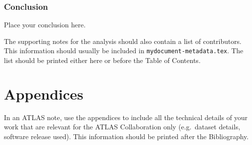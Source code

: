 \documentclass[NOTE, atlasdraft=true, texlive=2016, UKenglish]{\ATLASLATEXPATH atlasdoc}
\begin{document}


\section{Conclusion}
\label{sec:conclusion}

Place your conclusion here.


\printbibliography
%
%

\clearpage
The supporting notes for the analysis should also contain a list of contributors.
This information should usually be included in \texttt{mydocument-metadata.tex}.
The list should be printed either here or before the Table of Contents.


\clearpage
\appendix
\part*{Appendices}

In an ATLAS note, use the appendices to include all the technical details of your work
that are relevant for the ATLAS Collaboration only (e.g.\ dataset details, software release used).
This information should be printed after the Bibliography.
\end{document}
